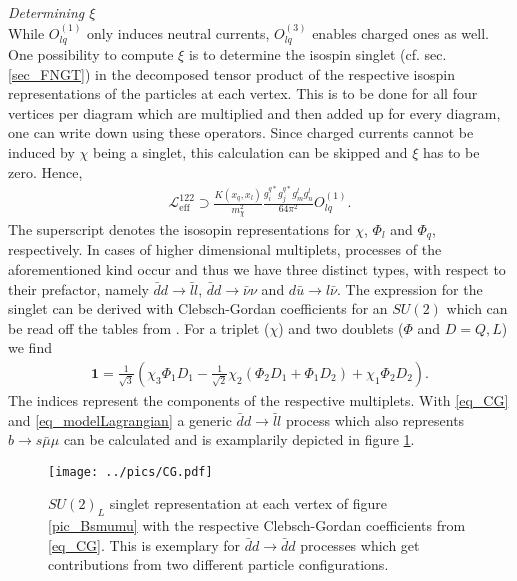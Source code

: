 \\ \\ \textit{Determining $\xi$}\\
\noindent While $O_{lq}^{(1)}$ only induces neutral currents, $O_{lq}^{(3)}$ enables charged ones as well. One possibility to compute $\xi$ is
to determine the isospin singlet (cf. sec. \ref{sec_FNGT}) in the decomposed tensor product of the respective isospin representations of the 
particles at each vertex. This is to be done for all four vertices per diagram which are multiplied and then added up for every diagram,
one can write down using these operators. Since charged currents cannot be induced by $\chi$ being a singlet, this calculation can be skipped
and $\xi$ has to be zero. Hence,
\begin{align}
  \mathcal{L}^{{122}}_\text{eff} \supset \frac{K(x_q,x_l)}{m_\chi^2}\frac{g_i^{q*} g_j^{q*} g_m^l g_n^l}{64\pi^2}  O_{lq}^{(1)}.
 \label{eq_LagBSmumuModA}
\end{align}
The superscript denotes the isosopin representations for $\chi$, $\Phi_l$ and $\Phi_q$, respectively. In cases of higher dimensional multiplets, 
processes of the aforementioned kind occur and thus we have three distinct types, with respect 
to their prefactor, namely $\bar d d\rightarrow \bar l l$, $\bar d d \rightarrow \bar\nu \nu$ and $d \bar u\rightarrow l\bar\nu$. The expression
for the singlet can be derived with Clebsch-Gordan coefficients for an $SU(2)$ which can be read off the tables from \cite{PDG}.
For a triplet ($\chi$) and two doublets ($\Phi$ and $D=Q,L$) we find
\begin{align}
{\textbf{1}} = \frac{1}{\sqrt{3}}\left(\chi_3\Phi_1D_1 - \frac{1}{\sqrt{2}}\chi_2\left(\Phi_2D_1+\Phi_1 D_2\right) + \chi_1\Phi_2D_2 \right).
 \label{eq_CG}
\end{align}
The indices represent the components of the respective multiplets. With \eqref{eq_CG} and \eqref{eq_modelLagrangian} a generic 
$\bar d d\rightarrow \bar l l$ process which also represents $ b  \rightarrow s\bar \mu \mu$ can be calculated and is examplarily depicted in
figure \ref{pic_CG}.
\begin{figure}[t]
 \texttt{[image: ../pics/CG.pdf]}
 \caption{$SU(2)_L$ singlet representation at each vertex of figure \ref{pic_Bsmumu} with the respective Clebsch-Gordan coefficients from \eqref{eq_CG}. 
 This is exemplary for $\bar d d\rightarrow \bar d d$ processes which get contributions from two different particle configurations.}
 \label{pic_CG}
\end{figure}
